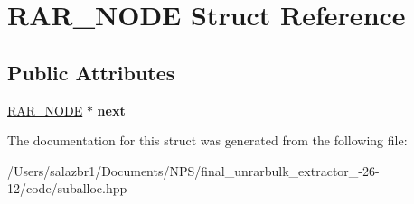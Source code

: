 \hypertarget{struct_r_a_r___n_o_d_e}{\section{R\-A\-R\-\_\-\-N\-O\-D\-E Struct Reference}
\label{struct_r_a_r___n_o_d_e}
}
\subsection*{Public Attributes}
\begin{DoxyCompactItemize}
\item 
\hypertarget{struct_r_a_r___n_o_d_e_a21793bfa96e2fd1f9de881237f8c6cc9}{\hyperlink{struct_r_a_r___n_o_d_e}{R\-A\-R\-\_\-\-N\-O\-D\-E} $\ast$ {\bfseries next}}\label{struct_r_a_r___n_o_d_e_a21793bfa96e2fd1f9de881237f8c6cc9}

\end{DoxyCompactItemize}


The documentation for this struct was generated from the following file\-:\begin{DoxyCompactItemize}
\item 
/\-Users/salazbr1/\-Documents/\-N\-P\-S/final\-\_\-unrarbulk\-\_\-extractor\-\_-\/26-\/12/code/suballoc.\-hpp\end{DoxyCompactItemize}
